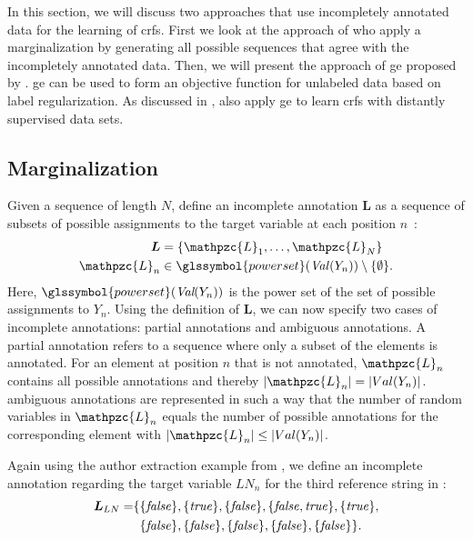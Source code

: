 In this section, we will discuss two approaches that use incompletely annotated data for the learning of \glspl{crf}.
First we look at the approach of \citet{tsuboi2008training} who apply a marginalization by generating all possible sequences that agree with the incompletely annotated data.
Then, we will present the approach of \acrfull{ge} proposed by \citet{mann2007simple}.
\Gls{ge} can be used to form an \gls{objective function} for unlabeled data based on \gls{label regularization}.
As discussed in , \citet{lu2013web} also apply \gls{ge} to learn \glspl{crf} with distantly supervised data sets.

\subsection{Marginalization}\label{subsec:marginalization}

Given a sequence of length $N$, \citet{tsuboi2008training} define an incomplete annotation $\bm{L}$ as a sequence of subsets of possible assignments to the \gls{target variable} at each position $n$~\citep{tsuboi2008training}:
\begin{equation}
  \label{equ:incomplete-annotation}
  \begin{split}
    \bm{L}&= \left\{\mathpzc{L}_1,\dots,\mathpzc{L}_N\right\}\\
    \mathpzc{L}_n&\in\glssymbol{power set}(\mathit{Val}(Y_n))\setminus \{\emptyset\}.
  \end{split}
\end{equation}
Here, $\glssymbol{power set}(\textit{Val}(Y_n))$ is the \gls{power set} of the set of possible \glspl{assignment} to $Y_n$.
Using the definition of $\bm{L}$, we can now specify two cases of incomplete annotations: \Glspl{partial annotation} and \glspl{ambiguous annotation}.
A \gls{partial annotation} refers to a sequence where only a subset of the elements is annotated.
For an element at position $n$ that is not annotated, $\mathpzc{L}_n$ contains all possible annotations and thereby $|\mathpzc{L}_n|=|Val(Y_n)|$.
\Glspl{ambiguous annotation} are represented in such a way that the number of \glspl{random variable} in $\mathpzc{L}_n$ equals the number of possible annotations for the corresponding element with $|\mathpzc{L}_n|\leq |Val(Y_n)|$.

Again using the author extraction example from , we define an incomplete annotation regarding the \gls{target variable} $LN_n$ for the third reference string in :
\begin{equation*}
\begin{split}
  \bm{L}_{LN}=&\{\{\mathit{false}\},\{\mathit{true}\},\{\mathit{false}\},\{\mathit{false},\mathit{true}\},\{\mathit{true}\},\\
  &\hphantom{\{}\{\mathit{false}\},\{\mathit{false}\},\{\mathit{false}\},\{\mathit{false}\},\{\mathit{false}\}\}.
\end{split}
\end{equation*}

